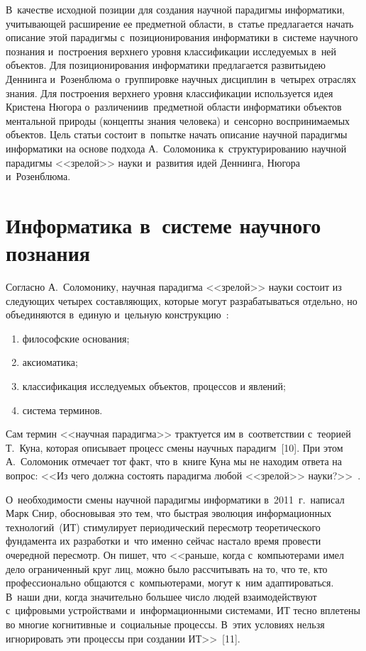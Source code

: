 {\begin{multicols}{2}
  В~качестве исходной позиции для создания научной парадигмы 
информатики, учи\-ты\-ва\-ющей расшире\-ние ее предметной об\-ласти, в~\mbox{статье} 
пред\-ла\-га\-ет\-ся начать описание этой парадигмы с~по\-зи\-ционирования 
информатики в~сис\-те\-ме научного познания и~по\-стро\-ения верхнего уровня 
классификации  ис\-сле\-ду\-емых в~ней объектов. Для позиционирования 
информатики предлагается развить\linebreak идею Деннинга и~Розенблюма 
о~группировке научных дисциплин в~четырех отраслях знания. Для\linebreak 
по\-стро\-ения верх\-не\-го уровня классификации используется идея Кристена 
Нюгора о~различении\linebreak в~пред\-мет\-ной об\-ласти информатики объектов 
ментальной природы (концепты знания человека) и~сенсорно 
воспринимаемых объектов. 
%
Цель \mbox{статьи} со\-сто\-ит в~попытке начать описание 
научной парадигмы информатики на основе подхода А.~Соломоника 
к~структурированию научной парадигмы <<зрелой>> науки и~развития идей 
Деннинга, Нюгора и~Розенблюма.
  
\section{Информатика в~системе научного познания} %
  
  Согласно А.~Соломонику, научная парадигма <<зрелой>> науки состоит 
из сле\-ду\-ющих четырех со\-став\-ля\-ющих, которые могут разрабатываться 
отдельно, но объединяются в~единую и~цельную 
  конструкцию~\cite[с.~23--24]{9-zac}:
  \begin{enumerate}[(1)]
\item философские основания;
\item аксиоматика;
\item классификация исследуемых объектов, процессов и явлений;
\item система терминов.
  \end{enumerate}
  
  Сам термин <<научная парадигма>> трактуется им в~соответствии 
с~тео\-ри\-ей Т.~Куна, которая описывает процесс смены научных 
парадигм~[10]. При этом А.~Соломоник отмечает тот факт, что в~книге Куна 
мы не находим ответа на вопрос: <<Из чего долж\-на со\-сто\-ять парадигма 
любой <<зрелой>> науки?>>~\cite[с.~23]{9-zac}.
  
  О~необходимости смены научной парадигмы информатики в~2011~г.\ 
написал Марк Снир, обосновывая это тем, что быст\-рая эволюция 
информационных технологий~(ИТ) стимулирует периодический пересмотр 
теоретического фундамента их разработки и~что именно сейчас настало 
время провести очередной пересмотр. Он пишет, что <<раньше, когда 
с~компьютерами имел дело ограниченный круг лиц, можно было 
рассчитывать на то, что те, кто профессионально общаются с~компьютерами, 
могут к~ним адаптироваться. В~наши дни, когда значительно большее чис\-ло 
людей взаимодействуют с~циф\-ро\-вы\-ми устройствами и~информационными 
сис\-те\-ма\-ми, ИТ тесно вплетены во многие когнитивные и~социальные 
процессы. В~этих условиях нельзя игнорировать эти процессы при создании 
ИТ>>~[11].
  

\end{multicols}}
